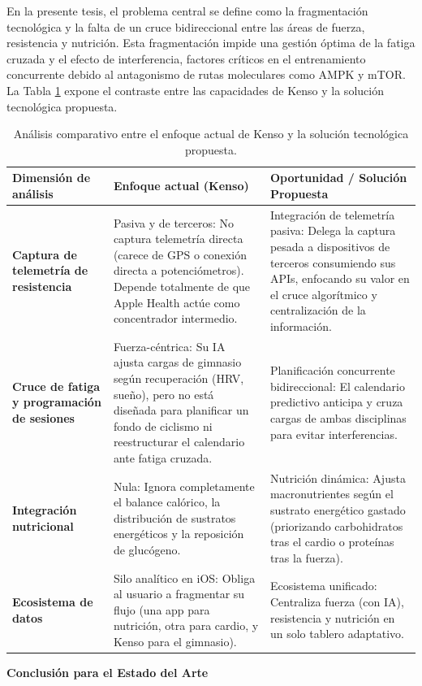 \documentclass[12pt]{article}
\begin{document}
En la presente tesis, el problema central se define como la fragmentación tecnológica y la falta de un cruce bidireccional entre las áreas de fuerza, resistencia y nutrición. Esta fragmentación impide una gestión óptima de la fatiga cruzada y el efecto de interferencia, factores críticos en el entrenamiento concurrente debido al antagonismo de rutas moleculares como AMPK y mTOR. La Tabla \ref{tab:analisis_kenso} expone el contraste entre las capacidades de Kenso y la solución tecnológica propuesta.

\begin{table}[h!]
    \centering
    \renewcommand{\arraystretch}{1.5}
    \begin{tabular}{|m{3.5cm}|m{5.5cm}|m{5.5cm}|}
        \hline
        \rowcolor[HTML]{EFEFEF}
        \textbf{Dimensión de análisis} & \textbf{Enfoque actual (Kenso)} & \textbf{Oportunidad / Solución Propuesta} \\ \hline
        \textbf{Captura de telemetría de resistencia} & Pasiva y de terceros: No captura telemetría directa (carece de GPS o conexión directa a potenciómetros). Depende totalmente de que Apple Health actúe como concentrador intermedio. & Integración de telemetría pasiva: Delega la captura pesada a dispositivos de terceros consumiendo sus APIs, enfocando su valor en el cruce algorítmico y centralización de la información. \\ \hline
        \textbf{Cruce de fatiga y programación de sesiones} & Fuerza-céntrica: Su IA ajusta cargas de gimnasio según recuperación (HRV, sueño), pero no está diseñada para planificar un fondo de ciclismo ni reestructurar el calendario ante fatiga cruzada. & Planificación concurrente bidireccional: El calendario predictivo anticipa y cruza cargas de ambas disciplinas para evitar interferencias. \\ \hline
        \textbf{Integración nutricional} & Nula: Ignora completamente el balance calórico, la distribución de sustratos energéticos y la reposición de glucógeno. & Nutrición dinámica: Ajusta macronutrientes según el sustrato energético gastado (priorizando carbohidratos tras el cardio o proteínas tras la fuerza). \\ \hline
        \textbf{Ecosistema de datos} & Silo analítico en iOS: Obliga al usuario a fragmentar su flujo (una app para nutrición, otra para cardio, y Kenso para el gimnasio). & Ecosistema unificado: Centraliza fuerza (con IA), resistencia y nutrición en un solo tablero adaptativo. \\ \hline
    \end{tabular}
    \caption{Análisis comparativo entre el enfoque actual de Kenso y la solución tecnológica propuesta.}
    \label{tab:analisis_kenso}
\end{table}
\newpage
\textbf{Conclusión para el Estado del Arte}
\end{document}
